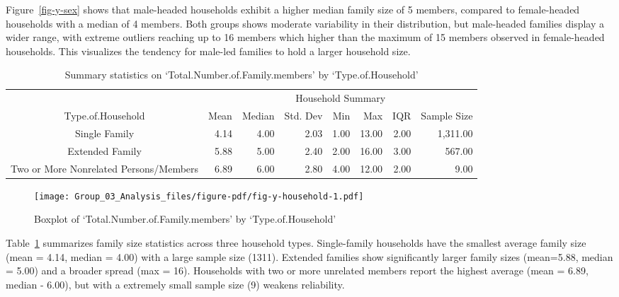 \documentclass[
]{article}
\begin{document}
Figure~\ref{fig-y-sex} shows that male-headed households exhibit a
higher median family size of 5 members, compared to female-headed
households with a median of 4 members. Both groups shows moderate
variability in their distribution, but male-headed families display a
wider range, with extreme outliers reaching up to 16 members which
higher than the maximum of 15 members observed in female-headed
households. This visualizes the tendency for male-led families to hold a
larger household size.

\hypertarget{tbl-y-household}{}
\begin{table}
\caption{\label{tbl-y-household}Summary statistics on `Total.Number.of.Family.members' by
`Type.of.Household' }\tabularnewline

\fontsize{9.0pt}{10.8pt}\selectfont
\begin{tabular*}{0.9\linewidth}{@{\extracolsep{\fill}}crrrrrrr}
\toprule
 & \multicolumn{7}{c}{Household Summary} \\ 
\cmidrule(lr){2-8}
Type.of.Household & Mean & Median & Std. Dev & Min & Max & IQR & Sample Size \\ 
\midrule\addlinespace[2.5pt]
Single Family & 4.14 & 4.00 & 2.03 & 1.00 & 13.00 & 2.00 & 1,311.00 \\ 
Extended Family & 5.88 & 5.00 & 2.40 & 2.00 & 16.00 & 3.00 & 567.00 \\ 
Two or More Nonrelated Persons/Members & 6.89 & 6.00 & 2.80 & 4.00 & 12.00 & 2.00 & 9.00 \\ 
\bottomrule
\end{tabular*}
\end{table}

\begin{figure}[H]

{\centering \texttt{[image: Group\_03\_Analysis\_files/figure-pdf/fig-y-household-1.pdf]}

}

\caption{\label{fig-y-household}Boxplot of
`Total.Number.of.Family.members' by `Type.of.Household'}

\end{figure}

Table~\ref{tbl-y-household} summarizes family size statistics across
three household types. Single-family households have the smallest
average family size (mean = 4.14, median = 4.00) with a large sample
size (1311). Extended families show significantly larger family sizes
(mean=5.88, median = 5.00) and a broader spread (max = 16). Households
with two or more unrelated members report the highest average (mean =
6.89, median - 6.00), but with a extremely small sample size (9) weakens
reliability.
\end{document}
